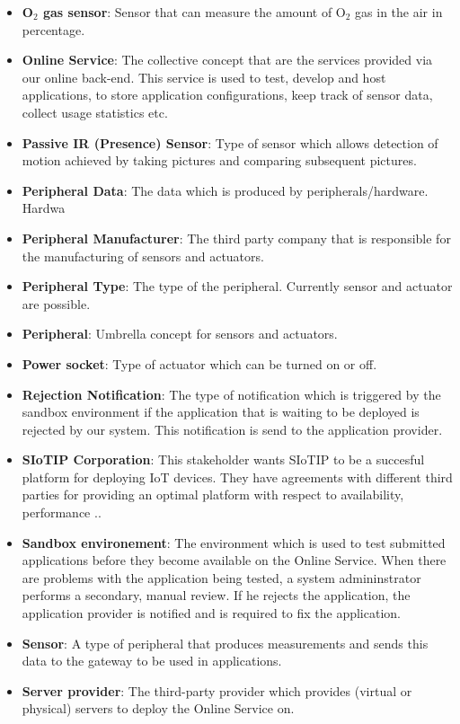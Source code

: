 \documentclass[english]{sareport}
\begin{document}
\begin{itemize}
	\item \textbf{O$_2$ gas sensor}: Sensor that can measure the amount of O$_2$ gas in the air  in percentage.
	\item \textbf{Online Service}: The collective concept that are the services provided via our online back-end. This service is used to test, develop and host applications, to store application configurations, keep track of sensor data, collect usage statistics etc. 
	\item \textbf{Passive IR (Presence) Sensor}: Type of sensor which allows detection of motion achieved by taking pictures and comparing subsequent pictures.
	\item \textbf{Peripheral Data}: The data which is produced by peripherals/hardware. Hardwa
	\item \textbf{Peripheral Manufacturer}: The third party company that is responsible for the manufacturing of sensors and actuators.
	\item \textbf{Peripheral Type}: The type of the peripheral. Currently sensor and actuator are possible.
	\item \textbf{Peripheral}: Umbrella concept for sensors and actuators.
	\item \textbf{Power socket}: Type of actuator which can be turned on or off.
	\item \textbf{Rejection Notification}: The type of notification which is triggered by the sandbox environment if the application that is waiting to be deployed is rejected by our system. This notification is send to the application provider.
	\item \textbf{SIoTIP Corporation}: This stakeholder wants SIoTIP to be a succesful platform for deploying IoT devices. They have agreements with different third parties for providing an optimal platform with respect to availability, performance ..
	\item \textbf{Sandbox environement}: The environment which is used to test submitted applications before they become available on the Online Service. When there are problems with the application being tested, a system admininstrator performs a secondary, manual review. If he rejects the application, the application provider is notified and is required to fix the application.
	\item \textbf{Sensor}: A type of peripheral that produces measurements and sends this data to the gateway to be used in applications.
	\item \textbf{Server provider}: The third-party provider which provides (virtual or physical) servers to deploy the Online Service on.

\end{itemize}
\end{document}
